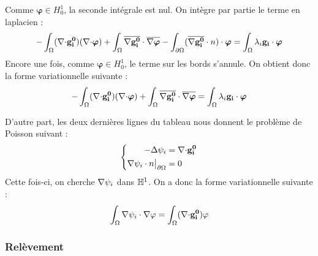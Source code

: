 Comme $\bm{\varphi}\in H^1_0$, la seconde intégrale est nul. On intègre par partie le terme en laplacien :
\[
-\int_\Omega ({\nabla\cdot} \mathbf{g_i^0})({\nabla\cdot}\bm{\varphi}) + \int_\Omega \overline{{\nabla} \mathbf{g_i^0}}\cdot\overline{{\nabla}\bm{\varphi}} - \int_{\partial\Omega} (\overline{{\nabla} \mathbf{g_i^0}}\cdot n)\cdot\bm{\varphi} = \int_\Omega \lambda_i\mathbf{g_i}\cdot\bm{\varphi}
\]
Encore une fois, comme $\bm{\varphi}\in H^1_0$, le terme sur les bords s'annule. On obtient donc la forme variationnelle suivante :
\begin{equation}
\label{fvgi0}
-\int_\Omega ({\nabla\cdot} \mathbf{g_i^0})({\nabla\cdot}\bm{\varphi}) + \int_\Omega \overline{{\nabla} \mathbf{g_i^0}}\cdot\overline{{\nabla}\bm{\varphi}} = \int_\Omega \lambda_i\mathbf{g_i}\cdot\bm{\varphi}
\end{equation}

D'autre part, les deux dernières lignes du tableau nous donnent le problème de Poisson suivant :
\begin{equation}
\label{psi}
\left\{
\begin{aligned}
-{\Delta}\psi_i &= {\nabla\cdot} \mathbf{g_i^0}\\
{\nabla}\psi_i\cdot n{\big\rvert_{\partial\Omega}} &= 0
\end{aligned}
\right.
\end{equation}
Cette fois-ci, on cherche ${\nabla}\psi_i$ dans ${\mathbb{H}}^1$. On a donc la forme variationnelle suivante :
\begin{equation}
\label{fvpsi}
\int_\Omega {\nabla}\psi_i\cdot{\nabla}\varphi = \int_\Omega ({\nabla\cdot} \mathbf{g_i^0})\varphi
\end{equation}

\subsubsection{Relèvement}
\label{relev}

